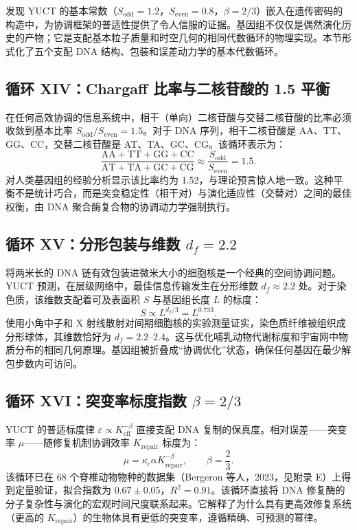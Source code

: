 \documentclass[12pt]{article}
\begin{document}
	发现 YUCT 的基本常数（$S_{\mathrm{odd}} = 1.2$，$S_{\mathrm{even}} = 0.8$，$\beta = 2/3$）嵌入在遗传密码的构造中，为协调框架的普适性提供了令人信服的证据。基因组不仅仅是偶然演化历史的产物；它是支配基本粒子质量和时空几何的相同代数循环的物理实现。本节形式化了五个支配 DNA 结构、包装和误差动力学的基本代数循环。
	
	\subsection{循环 XIV：Chargaff 比率与二核苷酸的 1.5 平衡}
	
	在任何高效协调的信息系统中，相干（单向）二核苷酸与交替二核苷酸的比率必须收敛到基本比率 $S_{\mathrm{odd}}/S_{\mathrm{even}} = 1.5$。对于 DNA 序列，相干二核苷酸是 AA、TT、GG、CC，交替二核苷酸是 AT、TA、GC、CG。该循环表示为：
	\begin{equation}
		\boxed{ \frac{\text{AA} + \text{TT} + \text{GG} + \text{CC}}{\text{AT} + \text{TA} + \text{GC} + \text{CG}} \approx \frac{S_{\mathrm{odd}}}{S_{\mathrm{even}}} = 1.5 }.
	\end{equation}
	对人类基因组的经验分析显示该比率约为 1.52，与理论预言惊人地一致。这种平衡不是统计巧合，而是突变稳定性（相干对）与演化适应性（交替对）之间的最佳权衡，由 DNA 聚合酶复合物的协调动力学强制执行。
	
	\subsection{循环 XV：分形包装与维数 $d_f = 2.2$}
	
	将两米长的 DNA 链有效包装进微米大小的细胞核是一个经典的空间协调问题。YUCT 预测，在层级网络中，最佳信息传输发生在分形维数 $d_f \approx 2.2$ 处。对于染色质，该维数支配着可及表面积 $S$ 与基因组长度 $L$ 的标度：
	\begin{equation}
		\boxed{ S \propto L^{d_f/3} = L^{0.733} }.
	\end{equation}
	使用小角中子和 X 射线散射对间期细胞核的实验测量证实，染色质纤维被组织成分形球体，其维数恰好为 $d_f = 2.2$–$2.4$。这与优化哺乳动物代谢标度和宇宙网中物质分布的相同几何原理。基因组被折叠成“协调优化”状态，确保任何基因在最少解包步数内可访问。
	
	\subsection{循环 XVI：突变率标度指数 $\beta = 2/3$}
	
	YUCT 的普适标度律 $\varepsilon \propto K_{\mathrm{eff}}^{-\beta}$ 直接支配 DNA 复制的保真度。相对误差——突变率 $\mu$——随修复机制协调效率 $K_{\mathrm{repair}}$ 标度为：
	\begin{equation}
		\boxed{ \mu = \kappa_c \alpha K_{\mathrm{repair}}^{-\beta}, \qquad \beta = \frac{2}{3} }.
	\end{equation}
	该循环已在 68 个脊椎动物物种的数据集（Bergeron 等人，2023，见附录 E）上得到定量验证，拟合指数为 $0.67 \pm 0.05$，$R^2 = 0.91$。该循环直接将 DNA 修复酶的分子复杂性与演化的宏观时间尺度联系起来。它解释了为什么具有更高效修复系统（更高的 $K_{\mathrm{repair}}$）的生物体具有更低的突变率，遵循精确、可预测的幂律。
	
\end{document}
